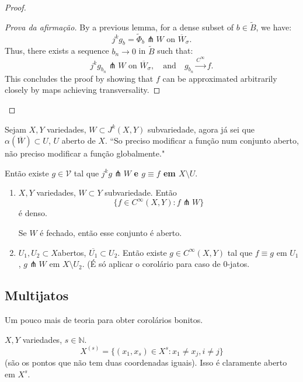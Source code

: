 \begin{proof}
\begin{proof}[Prova da afirmação]
By a previous lemma, for a dense subset of \(b \in \tilde{B}\), we have:
\[
j^k g_b = \tilde{\Phi}_b \pitchfork W \text{ on } \overline{W}_\sigma.
\]
Thus, there exists a sequence \(b_n \to 0\) in \(\tilde{B}\) such that:
\[
j^k g_{b_n} \pitchfork W \text{ on } \overline{W}_\sigma, \quad \text{and} \quad g_{b_n} \xrightarrow{C^\infty} f.
\]
This concludes the proof by showing that \(f\) can be approximated arbitrarily closely by maps achieving transversality.


\end{proof}

\end{proof}

\begin{coro}[da demostração]\leavevmode
Sejam \(X, Y\) variedades, \(W \subset J^k(X,Y)\) subvariedade, agora já sei que \(\alpha(\overline{W}) \subset U\), \(U\) aberto de \(X\). {\color{6}``So preciso modificar a função num conjunto aberto, não preciso modificar a função globalmente."}

Então existe \(g \in \mathcal{V}\) tal que \(j^kg \pitchfork W\) \textbf{e \(g \equiv f\) em \(X\setminus U\)}.
\end{coro}

\begin{coro}\leavevmode
\begin{enumerate}[label=(\alph*)]
\item \(X,Y\) variedades, \(W \subset Y\) subvariedade. Então
\[\{ f \in C^\infty (X,Y): f \pitchfork W\}\]
é denso.

Se \(W\) é fechado, então esse conjunto é aberto.
\item \(U_1,U_2\subset X\)abertos, \(\overline{U_1}\subset U_2\). Então existe \(g \in C^\infty (X,Y)\) tal que \(f \equiv g\) em \(U_1\), \(g \pitchfork W\) em \(X \setminus U_2\). (É só aplicar o corolário para caso de 0-jatos.
\end{enumerate}
\end{coro}

\subsection{Multijatos}
Um pouco mais de teoria para obter corolários bonitos.

\(X,Y\) variedades, \(s \in \mathbb{N}\).
\[X^{(s)}=\{(x_1,x_s)\in X^s: x_1 \neq  x_j, i\neq j\}\]
(são os pontos que não tem duas coordenadas iguais). Isso é claramente aberto em \(X^s\).

